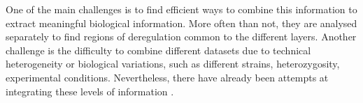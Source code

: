 One of the main challenges is to find efficient ways to combine this information to extract meaningful biological information. More often than not, they are analysed separately to find regions of deregulation common to the different layers. Another challenge is the difficulty to combine different datasets due to technical heterogeneity or biological variations, such as different strains, heterozygosity, experimental conditions. Nevertheless, there have already been attempts at integrating these levels of information \cite{argelaguetMOFAStatisticalFramework2020,kundajeIntegrativeAnalysis1112015}.

